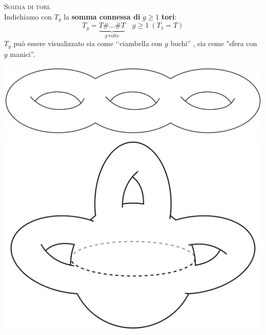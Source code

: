 \begin{define}\textsc{Somma di tori.}\\
	Indichiamo con $T_g$ la \textbf{somma connessa di }$g\geq 1$ \textbf{tori}:
	\begin{equation}
		T_g=\underbrace{T\# \ldots\# T}_{g\ \text{volte}}\quad g\geq 1\ \left(T_1=T\right)
	\end{equation}
$T_g$ può essere visualizzato sia come ‘‘ciambella con $g$ buchi'' , sia come "sfera con $g$ manici''.
\begin{center}
	\includegraphics[trim=0cm 0cm 0cm 0cm, clip, scale=0.25]{images/toruschain.pdf}
	\includegraphics[trim=0cm 0cm 0cm 0cm, clip, scale=0.25]{images/spherewithhandle.pdf}
\end{center}
\vspace{-3mm}
\end{define}
